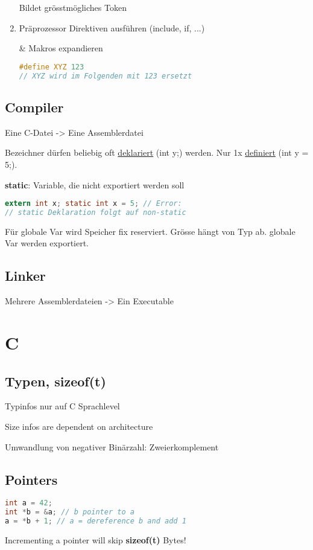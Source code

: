 \begin{multicols*}{4}
\begin{enumerate}
    Bildet grösstmögliches Token
    \item Präprozessor Direktiven ausführen (include, if, ...)

    \& Makros expandieren
    \begin{lstlisting}[language=c]
#define XYZ 123
// XYZ wird im Folgenden mit 123 ersetzt
    \end{lstlisting}
\end{enumerate}

\subsection{Compiler}
    Eine C-Datei -> Eine Assemblerdatei

    Bezeichner dürfen beliebig oft \underline{deklariert} (int y;) werden. Nur 1x \underline{definiert} (int y = 5;).

    \textbf{static}: Variable, die nicht exportiert werden soll

    \begin{lstlisting}[language=c]
extern int x; static int x = 5; // Error:
// static Deklaration folgt auf non-static
    \end{lstlisting}

    Für globale Var wird Speicher fix reserviert. Grösse hängt von Typ ab. globale Var werden exportiert.

\subsection{Linker}
Mehrere Assemblerdateien -> Ein Executable

\section{C}
\subsection{Typen, sizeof(t)}
Typinfos nur auf C Sprachlevel

Size infos are dependent on architecture

Umwandlung von negativer Binärzahl: Zweierkomplement

\subsection{Pointers}

\begin{lstlisting}[language=c]
int a = 42;
int *b = &a; // b pointer to a
a = *b + 1; // a = dereference b and add 1
\end{lstlisting}
Incrementing a pointer will skip \textbf{sizeof(t)} Bytes!


\end{multicols*}
